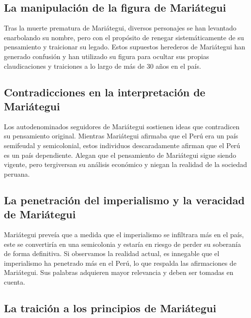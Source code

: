 \documentclass[
  letterpaper,
  DIV=11,
  numbers=noendperiod]{scrartcl}
\begin{document}
\hypertarget{la-manipulaciuxf3n-de-la-figura-de-mariuxe1tegui}{%
\subsection{La manipulación de la figura de
Mariátegui}\label{la-manipulaciuxf3n-de-la-figura-de-mariuxe1tegui}}

Tras la muerte prematura de Mariátegui, diversos personajes se han
levantado enarbolando su nombre, pero con el propósito de renegar
sistemáticamente de su pensamiento y traicionar su legado. Estos
supuestos herederos de Mariátegui han generado confusión y han utilizado
su figura para ocultar sus propias claudicaciones y traiciones a lo
largo de más de 30 años en el país.

\hypertarget{contradicciones-en-la-interpretaciuxf3n-de-mariuxe1tegui}{%
\subsection{Contradicciones en la interpretación de
Mariátegui}\label{contradicciones-en-la-interpretaciuxf3n-de-mariuxe1tegui}}

Los autodenominados seguidores de Mariátegui sostienen ideas que
contradicen su pensamiento original. Mientras Mariátegui afirmaba que el
Perú era un país semifeudal y semicolonial, estos individuos
descaradamente afirman que el Perú es un país dependiente. Alegan que el
pensamiento de Mariátegui sigue siendo vigente, pero tergiversan su
análisis económico y niegan la realidad de la sociedad peruana.

\hypertarget{la-penetraciuxf3n-del-imperialismo-y-la-veracidad-de-mariuxe1tegui}{%
\subsection{La penetración del imperialismo y la veracidad de
Mariátegui}\label{la-penetraciuxf3n-del-imperialismo-y-la-veracidad-de-mariuxe1tegui}}

Mariátegui preveía que a medida que el imperialismo se infiltrara más en
el país, este se convertiría en una semicolonia y estaría en riesgo de
perder su soberanía de forma definitiva. Si observamos la realidad
actual, es innegable que el imperialismo ha penetrado más en el Perú, lo
que respalda las afirmaciones de Mariátegui. Sus palabras adquieren
mayor relevancia y deben ser tomadas en cuenta.

\hypertarget{la-traiciuxf3n-a-los-principios-de-mariuxe1tegui}{%
\subsection{La traición a los principios de
Mariátegui}\label{la-traiciuxf3n-a-los-principios-de-mariuxe1tegui}}
\end{document}

